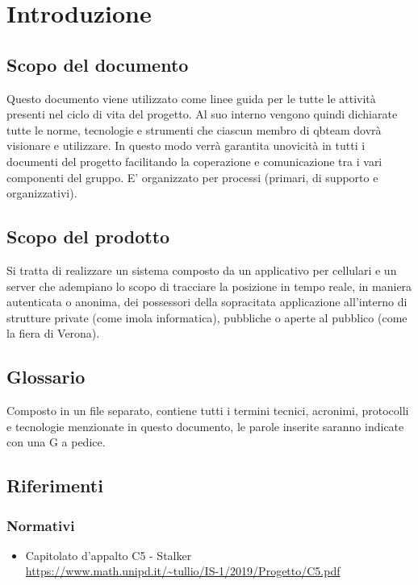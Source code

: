 \section{Introduzione}
\subsection{Scopo del documento}
	Questo documento viene utilizzato come linee guida per le tutte le attività presenti nel ciclo di vita del progetto.
	Al suo interno vengono quindi dichiarate tutte le norme, tecnologie e strumenti che ciascun membro di qbteam dovrà visionare e utilizzare.
	In questo modo verrà garantita unovicità in tutti i documenti del progetto facilitando la coperazione e comunicazione tra i vari componenti del gruppo.
	E' organizzato per processi (primari, di supporto e organizzativi).
	
\subsection{Scopo del prodotto}
	Si tratta di realizzare un sistema composto da un applicativo per cellulari e un server che adempiano lo scopo di tracciare la posizione in tempo reale, in maniera autenticata o anonima, dei possessori della sopracitata applicazione all’interno di strutture private (come imola informatica),  pubbliche o aperte al pubblico (come la fiera di Verona).
	 
\subsection{Glossario}
	Composto in un file separato, contiene tutti i termini tecnici, acronimi, protocolli e tecnologie menzionate in questo documento, le parole inserite saranno indicate con una G a pedice.
	
\subsection{Riferimenti} 
\subsubsection{Normativi}
\begin{itemize}
	\item Capitolato d'appalto C5 - Stalker 
	\\ \url{https://www.math.unipd.it/~tullio/IS-1/2019/Progetto/C5.pdf}
\end{itemize}


